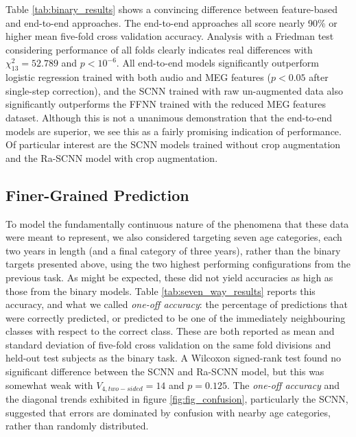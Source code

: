 \documentclass[fleqn,10pt]{wlscirep}
\begin{document}
Table \ref{tab:binary_results} shows a convincing difference between feature-based and end-to-end approaches. The end-to-end approaches all score nearly 90\% or higher mean five-fold cross validation accuracy. Analysis with a Friedman test considering performance of all folds clearly indicates real differences with $\chi^2_{13}=52.789$ and $p<10^{-6}$. All end-to-end models significantly outperform logistic regression trained with both audio and MEG features ($p<0.05$ after single-step correction), and the SCNN trained with raw un-augmented data also significantly outperforms the FFNN trained with the reduced MEG features dataset. Although this is not a unanimous demonstration that the end-to-end models are superior, we see this as a fairly promising indication of performance. Of particular interest are the SCNN models trained without crop augmentation and the Ra-SCNN model with crop augmentation.

\subsection*{Finer-Grained Prediction}

To model the fundamentally continuous nature of the phenomena that these data were meant to represent, we also considered targeting seven age categories, each two years in length (and a final category of three years), rather than the binary targets presented above, using the two highest performing configurations from the previous task. As might be expected, these did not yield accuracies as high as those from the binary models. Table \ref{tab:seven_way_results} reports this accuracy, and what we called {\em one-off accuracy}: the percentage of predictions that were correctly predicted, or predicted to be one of the immediately neighbouring classes with respect to the correct class. These are both reported as mean and standard deviation of five-fold cross validation on the same fold divisions and held-out test subjects as the binary task. A Wilcoxon signed-rank test found no significant difference between the SCNN and Ra-SCNN model, but this was somewhat weak with $V_{4, two-sided}=14$ and $p=0.125$. The {\em one-off accuracy} and the diagonal trends exhibited in figure \ref{fig:fig_confusion}, particularly the SCNN, suggested that errors are dominated by confusion with nearby age categories, rather than randomly distributed.
\end{document}
